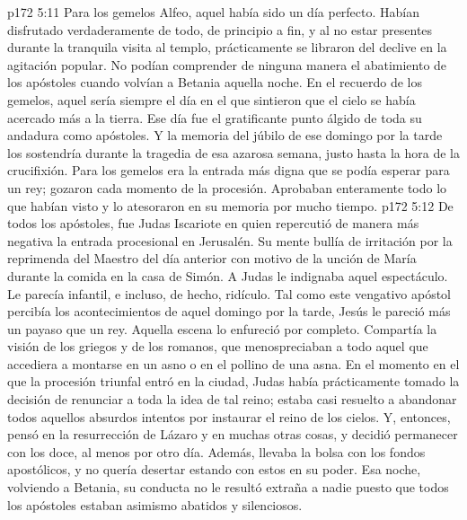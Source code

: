 \vs p172 5:11 Para los gemelos Alfeo, aquel había sido un día perfecto. Habían disfrutado verdaderamente de todo, de principio a fin, y al no estar presentes durante la tranquila visita al templo, prácticamente se libraron del declive en la agitación popular. No podían comprender de ninguna manera el abatimiento de los apóstoles cuando volvían a Betania aquella noche. En el recuerdo de los gemelos, aquel sería siempre el día en el que sintieron que el cielo se había acercado más a la tierra. Ese día fue el gratificante punto álgido de toda su andadura como apóstoles. Y la memoria del júbilo de ese domingo por la tarde los sostendría durante la tragedia de esa azarosa semana, justo hasta la hora de la crucifixión. Para los gemelos era la entrada más digna que se podía esperar para un rey; gozaron cada momento de la procesión. Aprobaban enteramente todo lo que habían visto y lo atesoraron en su memoria por mucho tiempo.
\vs p172 5:12 De todos los apóstoles, fue Judas Iscariote en quien repercutió de manera más negativa la entrada procesional en Jerusalén. Su mente bullía de irritación por la reprimenda del Maestro del día anterior con motivo de la unción de María durante la comida en la casa de Simón. A Judas le indignaba aquel espectáculo. Le parecía infantil, e incluso, de hecho, ridículo. Tal como este vengativo apóstol percibía los acontecimientos de aquel domingo por la tarde, Jesús le pareció más un payaso que un rey. Aquella escena lo enfureció por completo. Compartía la visión de los griegos y de los romanos, que menospreciaban a todo aquel que accediera a montarse en un asno o en el pollino de una asna. En el momento en el que la procesión triunfal entró en la ciudad, Judas había prácticamente tomado la decisión de renunciar a toda la idea de tal reino; estaba casi resuelto a abandonar todos aquellos absurdos intentos por instaurar el reino de los cielos. Y, entonces, pensó en la resurrección de Lázaro y en muchas otras cosas, y decidió permanecer con los doce, al menos por otro día. Además, llevaba la bolsa con los fondos apostólicos, y no quería desertar estando con estos en su poder. Esa noche, volviendo a Betania, su conducta no le resultó extraña a nadie puesto que todos los apóstoles estaban asimismo abatidos y silenciosos.
